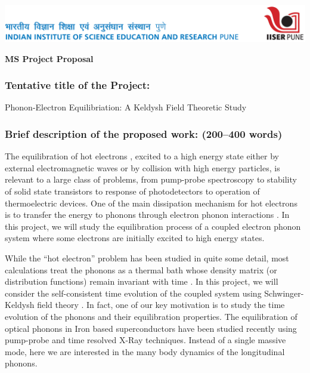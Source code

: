 \documentclass[10pt]{article}
\newcommand\dunderline[3][-1pt]{{%
  \setbox0=\hbox{#3}
  \ooalign{\copy0\cr\rule[\dimexpr#1-#2\relax]{\wd0}{#2}}}}
\begin{document}
\vspace*{-25mm}
\hspace*{-20mm}

\includegraphics{internal-lhead.png}

\begin{center}
{\bfseries\large MS Project Proposal}
\end{center}


\subsubsection*{Tentative title of the Project:} 
Phonon-Electron Equilibriation: A Keldysh Field Theoretic Study

\subsubsection*{Brief description of the proposed work: (200--400 words)}
 
The equilibration of hot electrons , excited to a high energy state either by external electromagnetic waves or by collision with high energy particles, is relevant to a large class of problems, from pump-probe spectroscopy to stability of solid state transistors to response of photodetectors  to operation of thermoelectric devices. One of the main dissipation mechanism for hot electrons is to transfer the energy to phonons through electron phonon interactions . In this project, we will study the equilibration process of a coupled electron phonon system where some electrons are initially excited to high energy states.

While the “hot electron” problem has been studied in quite some detail, most calculations treat the phonons as a thermal bath whose density matrix (or distribution functions) remain invariant with time \cite{saavedra2016hot}. In this project, we will consider the self-consistent time evolution of the coupled system using Schwinger-Keldysh field theory \cite{keldysh1965diagram,kamenev2011field}. In fact, one of our key motivation is to study the time evolution of the phonons and their equilibration properties. The equilibration of optical phonons in Iron based superconductors have been studied recently using pump-probe  and time resolved X-Ray techniques\cite{mansart2010ultrafast}. Instead of a single massive mode, here we are interested in the many body dynamics of the longitudinal phonons.
\end{document}
